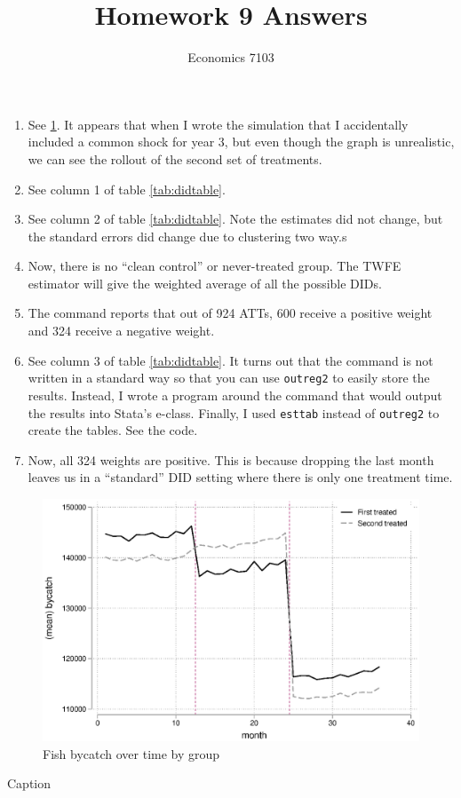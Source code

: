 \documentclass{article}
\title{Homework 9 Answers}
\author{Economics 7103}
\date{ }
\begin{document}
  
\maketitle

\begin{enumerate}
    \item See \ref{fig:hw9q1}.  It appears that when I wrote the simulation that I accidentally included a common shock for year 3, but even though the graph is unrealistic, we can see the rollout of the second set of treatments.
    \item See column 1 of table \ref{tab:didtable}.
    \item See column 2 of table \ref{tab:didtable}.  Note the estimates did not change, but the standard errors did change due to clustering two way.s
    \item Now, there is no ``clean control'' or never-treated group.  The TWFE estimator will give the weighted average of all the possible DIDs.
    \item The command reports that out of 924 ATTs, 600 receive a positive weight and 324 receive a negative weight.
    \item See column 3 of table \ref{tab:didtable}.  It turns out that the command is not written in a standard way so that you can use \verb!outreg2! to easily store the results.  Instead, I wrote a program around the command that would output the results into Stata's e-class.  Finally, I used \verb!esttab! instead of \verb!outreg2! to create the tables.  See the code.
    \item Now, all 324 weights are positive.  This is because dropping the last month leaves us in a ``standard'' DID setting where there is only one treatment time.
\end{enumerate}

\begin{figure}
    \centering
    \includegraphics{hw9q1.eps}
    \caption{Fish bycatch over time by group}
    \label{fig:hw9q1}
\end{figure}

\begin{table}[]
    \centering
    
    \caption{Caption}
    \label{tab:didtable}
\end{table}
\end{document}
